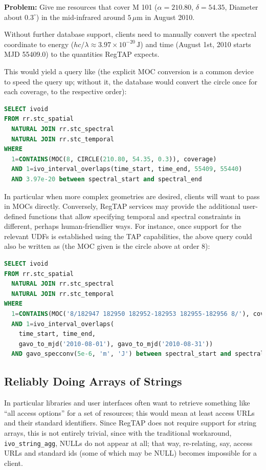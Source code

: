 \documentclass[11pt,a4paper]{ivoa}
\begin{document}
\textbf{Problem:} Give me resources that cover M 101 ($\alpha=210.80$,
$\delta=54.35$, Diameter about $0.3^\circ$) in the mid-infrared around
$5\,\mu\textrm{m}$ in August 2010.

Without further database support, clients need to manually convert the
spectral coordinate to energy ($hc/\lambda \approx 3.97\times
10^{-20}\,\textrm{J}$) and time (August 1st, 2010 starts MJD 55409.0) to
the quantities RegTAP expects.

This would yield a query like (the explicit MOC conversion is a common
device to speed the query up; without it, the database would convert the
circle once for each coverage, to the respective order):

\begin{lstlisting}[language=SQL,flexiblecolumns=true]
SELECT ivoid
FROM rr.stc_spatial
  NATURAL JOIN rr.stc_spectral
  NATURAL JOIN rr.stc_temporal
WHERE
  1=CONTAINS(MOC(8, CIRCLE(210.80, 54.35, 0.3)), coverage)
  AND 1=ivo_interval_overlaps(time_start, time_end, 55409, 55440)
  AND 3.97e-20 between spectral_start and spectral_end
\end{lstlisting}

In particular when more complex geometries are desired, clients will
want to pass in MOCs directly.  Conversely, RegTAP services may provide
the additional user-defined functions that allow specifying temporal and
spectral constraints in different, perhaps human-friendlier ways.  For
instance, once support for the relevant UDFs is established using the
TAP capabilities, the above query
could also be written as (the MOC given is the circle above at order 8):

\begin{lstlisting}[language=SQL,basicstyle=\footnotesize]
SELECT ivoid
FROM rr.stc_spatial
  NATURAL JOIN rr.stc_spectral
  NATURAL JOIN rr.stc_temporal
WHERE
  1=CONTAINS(MOC('8/182947 182950 182952-182953 182955-182956 8/'), coverage)
  AND 1=ivo_interval_overlaps(
    time_start, time_end,
    gavo_to_mjd('2010-08-01'), gavo_to_mjd('2010-08-31'))
  AND gavo_specconv(5e-6, 'm', 'J') between spectral_start and spectral_end
\end{lstlisting}

\subsection{Reliably Doing Arrays of Strings}

In particular libraries and user interfaces often want to retrieve
something like ``all access options'' for a set of resources; this would
mean at least access URLs and their standard identifiers.  Since RegTAP
does not require support for string arrays, this is not entirely
trivial, since with the traditional workaround, \verb|ivo_string_agg|,
NULLs do not appear at all; that way, re-relating, say, access URLs and
standard ids (some of which may be NULL) becomes impossible for a
client.
\end{document}
